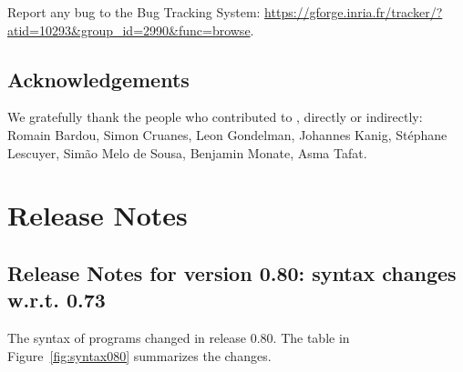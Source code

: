 \documentclass[a4paper,11pt,twoside,openright]{memoir}
\begin{document}
Report any bug to the \why Bug Tracking System:
\url{https://gforge.inria.fr/tracker/?atid=10293&group_id=2990&func=browse}.


\subsection*{Acknowledgements}

We gratefully thank the people who contributed to \why, directly or
indirectly: Romain Bardou, Simon Cruanes, Leon Gondelman, Johannes Kanig,
St\'ephane Lescuyer, Sim\~ao Melo de Sousa, Benjamin Monate, Asma Tafat.

\section{Release Notes}

\subsection{Release Notes for version 0.80: syntax changes w.r.t. 0.73}

The syntax of \whyml programs changed in release 0.80. 
The table in Figure~\ref{fig:syntax080} summarizes the changes.
\end{document}
